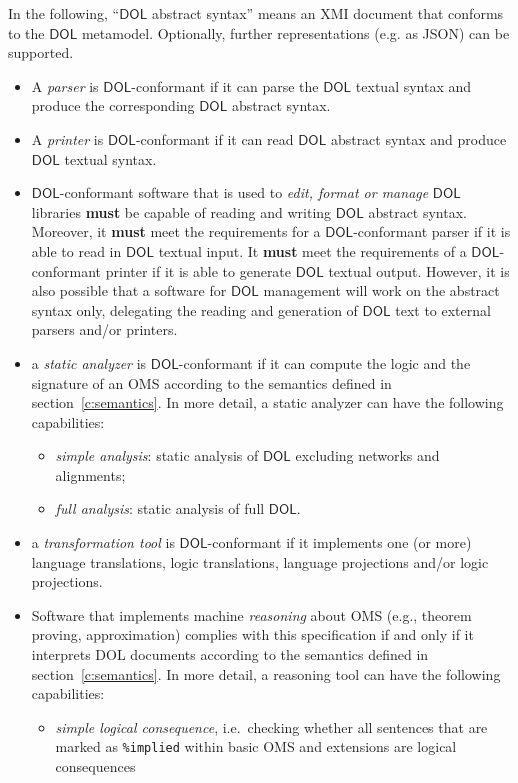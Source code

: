 \documentclass[10pt,fleqn,final]{scrreprt}
\newcommand*{\syntax}[1]{\texttt{#1}}
\newcommand*{\hasto}{\textbf{must}\xspace}
\newcommand*{\DOL}{\ensuremath{\mathsf{DOL}}\xspace}
\begin{document}
In the following, ``\DOL abstract syntax'' means an XMI document that
conforms to the \DOL metamodel. Optionally, further representations
(e.g. as JSON) can be supported.
\begin{itemize}
\item
A \emph{parser} is \DOL-conformant if it can parse the \DOL textual syntax and produce the corresponding \DOL abstract syntax.
\item
A \emph{printer} is \DOL-conformant if it can read \DOL abstract syntax and produce \DOL textual syntax.
\item
{\DOL}-conformant software that is used to \emph{edit, format or manage} \DOL libraries \hasto be capable of reading and writing \DOL abstract syntax. Moreover, it \hasto meet the requirements for a \DOL-conformant parser if it is able to read in \DOL textual input. It \hasto meet the requirements of a \DOL-conformant printer if it is able to generate \DOL textual output. However, it is also possible that a software for \DOL management will work on the abstract syntax only, delegating the reading and generation of \DOL text to external parsers and/or printers.
\item a \emph{static analyzer} is \DOL-conformant if it can compute
  the logic and the signature of an OMS according to the semantics
  defined in section~\ref{c:semantics}. In more detail, a static analyzer
  can have the following capabilities:
\begin{itemize}
\item \emph{simple analysis}: static analysis of \DOL excluding networks and alignments;
\item \emph{full analysis}: static analysis of full \DOL.
\end{itemize}
\item a \emph{transformation tool} is \DOL-conformant if it implements
one (or more) language translations, logic translations, language
projections and/or logic projections.
\item
Software that implements machine \emph{reasoning} about OMS (e.g., theorem proving, approximation)  complies with this specification if and only if it interprets  DOL documents according to the semantics defined in section~\ref{c:semantics}. In more detail, a reasoning tool can have the following capabilities:
\begin{itemize}
\item \emph{simple logical consequence}, i.e.\ checking whether all sentences that are marked as \syntax{\%implied} within basic OMS
and extensions are logical consequences

\end{itemize}
\end{itemize}
\end{document}
